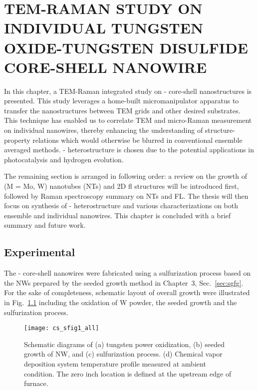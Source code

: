 \chapter{TEM-RAMAN STUDY ON INDIVIDUAL TUNGSTEN OXIDE-TUNGSTEN DISULFIDE CORE-SHELL NANOWIRE}

In this chapter, a TEM-Raman integrated study on - core-shell nanostructures is presented. This study leverages a home-built micromanipulator apparatus to transfer the nanostructures between TEM grids and other desired substrates. This technique has enabled us to correlate TEM and micro-Raman measurement on individual nanowires, thereby enhancing the understanding of structure-property relations which would otherwise be blurred in conventional ensemble averaged methods. - heterostructure is chosen due to the potential applications in photocatalysis and hydrogen evolution. 

The remaining section is arranged in following order: a review on the growth of  (M = Mo, W) nanotubes (NTs) and 2D \gls{fl} structures will be introduced first, followed by Raman spectroscopy summary on  NTs and FL. The thesis will then focus on synthesis of - heterostructure and various characterizations on both ensemble and individual nanowires. This chapter is concluded with a brief summary and future work.



\section{Experimental}

The - core-shell nanowires were fabricated using a sulfurization process based on the  NWs prepared by the seeded growth method in Chapter~3, Sec.~\ref{sec:sgfg}. For the sake of completeness, schematic layout of overall growth were illustrated in Fig.~\ref{fig:ch5grow} including the oxidation of W powder, the seeded growth and the sulfurization process.

\begin{figure}[htb]
\centering
\texttt{[image: cs\_sfig1\_all]}
\caption[ NW growth: OT]{Schematic diagrams of (a) tungsten power oxidization, (b) seeded growth of  NW, and (c) sulfurization process. (d) Chemical vapor deposition system temperature profile measured at ambient condition. The zero inch location is defined at the upstream edge of furnace.}
\label{fig:ch5grow}
\end{figure}

